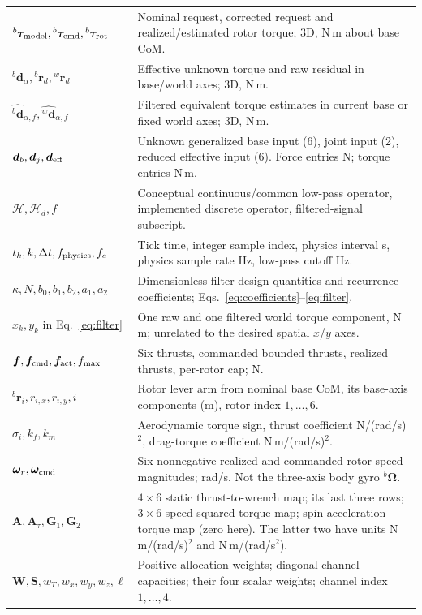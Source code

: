 \documentclass[11pt,a4paper]{article}
\newcommand{\vct}[1]{\boldsymbol{#1}}
\newcommand{\mat}[1]{\mathbf{#1}}
\newcommand{\bv}[1]{{}^{b}\vct{#1}}
\newcommand{\wv}[1]{{}^{w}\vct{#1}}
\begin{document}
\begin{longtable}{L{4.2cm}L{10.5cm}}
$\bv\tau_{\rm model},\bv\tau_{\rm cmd},\bv\tau_{\rm rot}$ & Nominal request, corrected request and realized/estimated rotor torque; 3D, N\,m about base CoM.\\
$\bv d_\alpha,\bv r_d,\wv r_d$ & Effective unknown torque and raw residual in base/world axes; 3D, N\,m.\\
$\widehat{\bv d}_{\alpha,f},\widehat{\wv d}_{\alpha,f}$ & Filtered equivalent torque estimates in current base or fixed world axes; 3D, N\,m.\\
$\vct d_b,\vct d_j,\vct d_{\rm eff}$ & Unknown generalized base input (6), joint input (2), reduced effective input (6). Force entries N; torque entries N\,m.\\
$\mathcal H,\mathcal H_d,f$ & Conceptual continuous/common low-pass operator, implemented discrete operator, filtered-signal subscript.\\
$t_k,k,\Delta t,f_{\rm physics},f_c$ & Tick time, integer sample index, physics interval s, physics sample rate Hz, low-pass cutoff Hz.\\
$\kappa,N,b_0,b_1,b_2,a_1,a_2$ & Dimensionless filter-design quantities and recurrence coefficients; Eqs.~\eqref{eq:coefficients}--\eqref{eq:filter}.\\
$x_k,y_k$ in Eq.~\eqref{eq:filter} & One raw and one filtered world torque component, N\,m; unrelated to the desired spatial $x$/$y$ axes.\\
$\vct f,\vct f_{\rm cmd},\vct f_{\rm act},f_{\max}$ & Six thrusts, commanded bounded thrusts, realized thrusts, per-rotor cap; N.\\
$\bv r_i,r_{i,x},r_{i,y},i$ & Rotor lever arm from nominal base CoM, its base-axis components (m), rotor index $1,\ldots,6$.\\
$\sigma_i,k_f,k_m$ & Aerodynamic torque sign, thrust coefficient N/(rad/s)$^2$, drag-torque coefficient N\,m/(rad/s)$^2$.\\
$\vct\omega_r,\vct\omega_{\rm cmd}$ & Six nonnegative realized and commanded rotor-speed magnitudes; rad/s. Not the three-axis body gyro $\bv\Omega$.\\
$\mat A,\mat A_\tau,\mat G_1,\mat G_2$ & $4\times6$ static thrust-to-wrench map; its last three rows; $3\times6$ speed-squared torque map; spin-acceleration torque map (zero here). The latter two have units N\,m/(rad/s)$^2$ and N\,m/(rad/s$^2$).\\
$\mat W,\mat S,w_T,w_x,w_y,w_z,\ell$ & Positive allocation weights; diagonal channel capacities; their four scalar weights; channel index $1,\ldots,4$.\\

\end{longtable}
\end{document}

